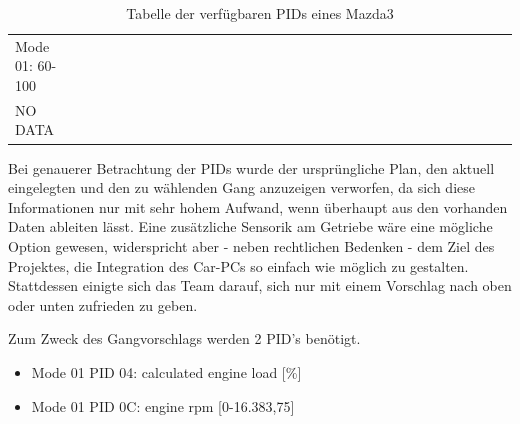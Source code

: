 \begin{table}[!htb]
{\begin{tabular}{lcccccccccccccccccccccccccccccccc}
\cellcolor[HTML]{9B9B9B}Mode 01: 60-100 & \multicolumn{1}{l}{} & \multicolumn{1}{l}{} & \multicolumn{1}{l}{} & \multicolumn{1}{l}{} & \multicolumn{1}{l}{} & \multicolumn{1}{l}{} & \multicolumn{1}{l}{} & \multicolumn{1}{l}{} & \multicolumn{1}{l}{} & \multicolumn{1}{l}{} & \multicolumn{1}{l}{} & \multicolumn{1}{l}{} & \multicolumn{1}{l}{} & \multicolumn{1}{l}{} & \multicolumn{1}{l}{} & \multicolumn{1}{l}{} & \multicolumn{1}{l}{} & \multicolumn{1}{l}{} & \multicolumn{1}{l}{} & \multicolumn{1}{l}{} & \multicolumn{1}{l}{} & \multicolumn{1}{l}{} & \multicolumn{1}{l}{} & \multicolumn{1}{l}{} & \multicolumn{1}{l}{} & \multicolumn{1}{l}{} & \multicolumn{1}{l}{} & \multicolumn{1}{l}{} & \multicolumn{1}{l}{} & \multicolumn{1}{l}{} & \multicolumn{1}{l}{} & \multicolumn{1}{l}{} \\ \cline{1-1}
\multicolumn{1}{|l|}{NO DATA} & \multicolumn{1}{l}{} & \multicolumn{1}{l}{} & \multicolumn{1}{l}{} & \multicolumn{1}{l}{} & \multicolumn{1}{l}{} & \multicolumn{1}{l}{} & \multicolumn{1}{l}{} & \multicolumn{1}{l}{} & \multicolumn{1}{l}{} & \multicolumn{1}{l}{} & \multicolumn{1}{l}{} & \multicolumn{1}{l}{} & \multicolumn{1}{l}{} & \multicolumn{1}{l}{} & \multicolumn{1}{l}{} & \multicolumn{1}{l}{} & \multicolumn{1}{l}{} & \multicolumn{1}{l}{} & \multicolumn{1}{l}{} & \multicolumn{1}{l}{} & \multicolumn{1}{l}{} & \multicolumn{1}{l}{} & \multicolumn{1}{l}{} & \multicolumn{1}{l}{} & \multicolumn{1}{l}{} & \multicolumn{1}{l}{} & \multicolumn{1}{l}{} & \multicolumn{1}{l}{} & \multicolumn{1}{l}{} & \multicolumn{1}{l}{} & \multicolumn{1}{l}{} & \multicolumn{1}{l}{} \\ \cline{1-1}
\end{tabular}}
\caption{Tabelle der verfügbaren PIDs eines Mazda3}
\label{tableMazda3}
\end{table}
Bei genauerer Betrachtung der PIDs wurde der ursprüngliche Plan, den aktuell eingelegten und den zu wählenden Gang anzuzeigen verworfen, da sich diese Informationen nur mit sehr hohem Aufwand, wenn überhaupt aus den vorhanden Daten ableiten lässt. Eine zusätzliche Sensorik am Getriebe wäre eine mögliche Option gewesen, widerspricht aber - neben rechtlichen Bedenken - dem Ziel des Projektes, die Integration des Car-PCs so einfach wie möglich zu gestalten. Stattdessen einigte sich das Team darauf, sich nur mit einem Vorschlag nach oben oder unten zufrieden zu geben. 

Zum Zweck des Gangvorschlags werden 2 PID's benötigt.
\begin{itemize}
	\item Mode 01 PID 04: calculated engine load [\%]
	\item Mode 01 PID 0C: engine rpm [0-16.383,75]
\end{itemize} 

